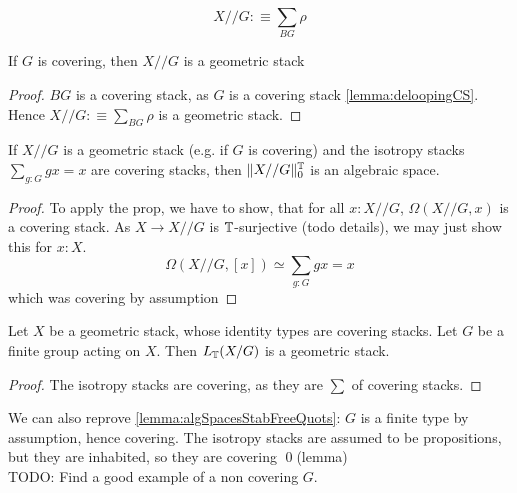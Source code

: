\documentclass{article}
\renewcommand{\GS}{\mathsf{GS}}
\begin{document}
\[
X // G :\equiv \sum_{BG} \rho
\]
\begin{lemma}
 If $G$ is covering, then $X // G$ is a geometric stack
\end{lemma}
\begin{proof}
	$BG$ is a covering stack, as $G$ is a covering stack \ref{lemma:deloopingCS}. Hence $X // G :\equiv \sum_{BG} \rho$ is a geometric stack.
\end{proof}
\begin{prop}
	If $X // G$ is a geometric stack (e.g. if $G$ is covering) and the isotropy stacks $\sum_{g : G} g x = x$ are covering stacks, then $\| X // G \|_0^{\mathbb{T}}$ is an algebraic space.
\end{prop}
\begin{proof}
	To apply the prop, we have to show, that for all $x : X // G$, $\Omega (X // G,x)$ is a covering stack. As $X \to X // G$ is $\mathbb{T}$-surjective (todo details), we may just show this for $x : X$.
	\[
	\Omega (X // G , [x]) \simeq \sum_{g: G} g x = x
	\]
	which was covering by assumption
\end{proof}
\begin{corollary}
	Let $X$ be a geometric stack, whose identity types are covering stacks. Let $G$ be a finite group acting on $X$. Then $L_{\mathbb{T}} (X / G)$ is a geometric stack.
\end{corollary}
\begin{proof}
	 The isotropy stacks are covering, as they are $\sum$ of covering stacks.
\end{proof}
We can also reprove \ref{lemma:algSpacesStabFreeQuots}: $G$ is a finite type by assumption, hence covering. The isotropy stacks are assumed to be propositions, but they are inhabited, so they are covering \qed(lemma) \\

TODO: Find a good example of a non covering $G$.




\end{document}
